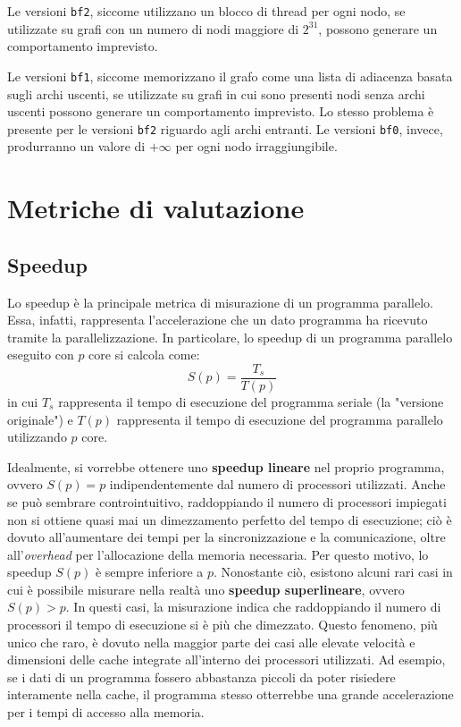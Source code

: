 \documentclass[12pt,a4paper,oneside]{book}
\begin{document}
	Le versioni \texttt{bf2}, siccome utilizzano un blocco di thread per ogni nodo, se utilizzate su grafi con un numero di nodi maggiore di $2^{31}$, possono generare un comportamento imprevisto.
	
	Le versioni \texttt{bf1}, siccome memorizzano il grafo come una lista di adiacenza basata sugli archi uscenti, se utilizzate su grafi in cui sono presenti nodi senza archi uscenti possono generare un comportamento imprevisto. Lo stesso problema è presente per le versioni \texttt{bf2} riguardo agli archi entranti. Le versioni \texttt{bf0}, invece, produrranno un valore di $+\infty$ per ogni nodo irraggiungibile.
	
	\chapter{Metriche di valutazione}
	\label{chap:metriche}
	\section{Speedup}
	Lo speedup è la principale metrica di misurazione di un programma parallelo. Essa, infatti, rappresenta l'accelerazione che un dato programma ha ricevuto tramite la parallelizzazione. In particolare, lo speedup di un programma parallelo eseguito con $p$ core si calcola come:
	\begin{equation}
		S(p) = \frac{T_s}{T(p)}
		\label{eq:speedup}
	\end{equation}
	in cui $T_s$ rappresenta il tempo di esecuzione del programma seriale (la "versione originale") e $T(p)$ rappresenta il tempo di esecuzione del programma parallelo utilizzando $p$ core.
	
	Idealmente, si vorrebbe ottenere uno \textbf{speedup lineare} nel proprio programma, ovvero $S(p) = p$ indipendentemente dal numero di processori utilizzati. Anche se può sembrare controintuitivo, raddoppiando il numero di processori impiegati non si ottiene quasi mai un dimezzamento perfetto del tempo di esecuzione; ciò è dovuto all'aumentare dei tempi per la sincronizzazione e la comunicazione, oltre all'\textit{overhead} per l'allocazione della memoria necessaria. Per questo motivo, lo speedup $S(p)$ è sempre inferiore a $p$. Nonostante ciò, esistono alcuni rari casi in cui è possibile misurare nella realtà uno \textbf{speedup superlineare}, ovvero $S(p) > p$. In questi casi, la misurazione indica che raddoppiando il numero di processori il tempo di esecuzione si è più che dimezzato. Questo fenomeno, più unico che raro, è dovuto nella maggior parte dei casi alle elevate velocità e dimensioni delle cache integrate all'interno dei processori utilizzati. Ad esempio, se i dati di un programma fossero abbastanza piccoli da poter risiedere interamente nella cache, il programma stesso otterrebbe una grande accelerazione per i tempi di accesso alla memoria.
	
\end{document}
